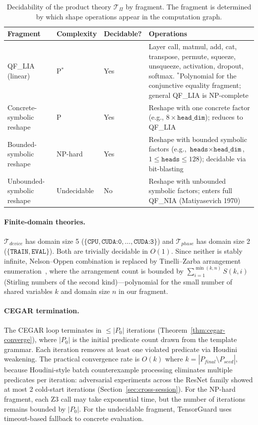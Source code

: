 \documentclass[11pt]{article}
\begin{document}
\begin{table}[h]
\centering
\caption{Decidability of the product theory $\mathcal{T}_\Pi$ by
  fragment.  The fragment is determined by which shape operations
  appear in the computation graph.}
\label{tab:decidability}
\small
\begin{tabular}{@{}lllp{5.5cm}@{}}
\toprule
\textbf{Fragment} & \textbf{Complexity} & \textbf{Decidable?} &
\textbf{Operations} \\
\midrule
QF\_LIA (linear)
  & P$^*$ & Yes & Layer call, matmul, add, cat, transpose,
    permute, squeeze, unsqueeze, activation, dropout, softmax.
    ${}^*$\!Polynomial for the conjunctive equality fragment;
    general QF\_LIA is NP-complete \\
Concrete-symbolic reshape
  & P & Yes & Reshape with one concrete factor
    (e.g., $8 \times \texttt{head\_dim}$); reduces to QF\_LIA \\
Bounded-symbolic reshape
  & NP-hard & Yes & Reshape with bounded symbolic factors
    (e.g., $\texttt{heads} \times \texttt{head\_dim}$,
    $1 \leq \texttt{heads} \leq 128$); decidable via bit-blasting \\
Unbounded-symbolic reshape
  & Undecidable & No & Reshape with unbounded symbolic factors;
    enters full QF\_NIA (Matiyasevich 1970) \\
\bottomrule
\end{tabular}
\end{table}

\paragraph{Finite-domain theories.}
$\mathcal{T}_{\mathit{device}}$ has domain size 5
($\{\texttt{CPU}, \texttt{CUDA:0}, \ldots, \texttt{CUDA:3}\}$)
and $\mathcal{T}_{\mathit{phase}}$ has domain size 2
($\{\texttt{TRAIN}, \texttt{EVAL}\}$).
Both are trivially decidable in $O(1)$.  Since neither is stably
infinite, Nelson--Oppen combination is replaced by Tinelli--Zarba
arrangement enumeration~\cite{tinelli03}, where the arrangement count
is bounded by $\sum_{i=1}^{\min(k, n)} S(k, i)$ (Stirling numbers of the
second kind)---polynomial
for the small number of shared variables $k$ and domain size $n$
in our fragment.

\paragraph{CEGAR termination.}
The CEGAR loop terminates in $\leq |P_0|$ iterations
(Theorem~\ref{thm:cegar-converge}), where $|P_0|$ is the initial
predicate count drawn from the template grammar.  Each iteration
removes at least one violated predicate via Houdini weakening.
The practical convergence rate is $O(k)$ where
$k = |P_{\mathit{final}} \setminus P_{\mathit{seed}}|$, because
Houdini-style batch counterexample processing eliminates multiple
predicates per iteration: adversarial experiments across the
ResNet family showed at most 2 cold-start iterations
(Section~\ref{sec:cross-session}).
For the NP-hard fragment, each Z3 call may
take exponential time, but the number of iterations remains bounded
by $|P_0|$.  For the undecidable fragment, TensorGuard uses timeout-based
fallback to concrete evaluation.
\end{document}
